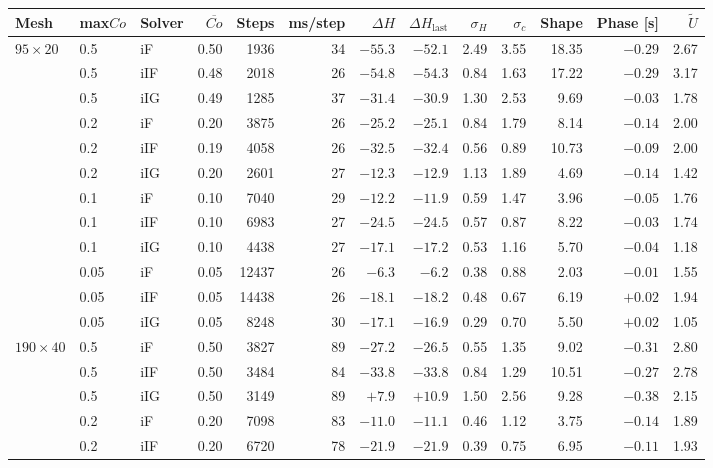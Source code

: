 \begin{tabular}{@{}lllrrrrrrrrrr@{}}
\toprule
Mesh & max$Co$ & Solver & $\overline{Co}$ & Steps & ms/step & $\Delta H$ & $\Delta H_\mathrm{last}$ & $\sigma_H$ & $\sigma_{c}$ & Shape & Phase [s] & $\tilde{U}$ \\
\midrule
$95\times20$ & 0.5 & iF & 0.50 & 1936 & 34 & $-55.3$ & $-52.1$ & 2.49 & 3.55 & 18.35 & $-0.29$ & 2.67 \\
 & 0.5 & iIF & 0.48 & 2018 & 26 & $-54.8$ & $-54.3$ & 0.84 & 1.63 & 17.22 & $-0.29$ & 3.17 \\
 & 0.5 & iIG & 0.49 & 1285 & 37 & $-31.4$ & $-30.9$ & 1.30 & 2.53 & 9.69 & $-0.03$ & 1.78 \\
 & 0.2 & iF & 0.20 & 3875 & 26 & $-25.2$ & $-25.1$ & 0.84 & 1.79 & 8.14 & $-0.14$ & 2.00 \\
 & 0.2 & iIF & 0.19 & 4058 & 26 & $-32.5$ & $-32.4$ & 0.56 & 0.89 & 10.73 & $-0.09$ & 2.00 \\
 & 0.2 & iIG & 0.20 & 2601 & 27 & $-12.3$ & $-12.9$ & 1.13 & 1.89 & 4.69 & $-0.14$ & 1.42 \\
 & 0.1 & iF & 0.10 & 7040 & 29 & $-12.2$ & $-11.9$ & 0.59 & 1.47 & 3.96 & $-0.05$ & 1.76 \\
 & 0.1 & iIF & 0.10 & 6983 & 27 & $-24.5$ & $-24.5$ & 0.57 & 0.87 & 8.22 & $-0.03$ & 1.74 \\
 & 0.1 & iIG & 0.10 & 4438 & 27 & $-17.1$ & $-17.2$ & 0.53 & 1.16 & 5.70 & $-0.04$ & 1.18 \\
 & 0.05 & iF & 0.05 & 12437 & 26 & $-6.3$ & $-6.2$ & 0.38 & 0.88 & 2.03 & $-0.01$ & 1.55 \\
 & 0.05 & iIF & 0.05 & 14438 & 26 & $-18.1$ & $-18.2$ & 0.48 & 0.67 & 6.19 & $+0.02$ & 1.94 \\
 & 0.05 & iIG & 0.05 & 8248 & 30 & $-17.1$ & $-16.9$ & 0.29 & 0.70 & 5.50 & $+0.02$ & 1.05 \\
\midrule
$190\times40$ & 0.5 & iF & 0.50 & 3827 & 89 & $-27.2$ & $-26.5$ & 0.55 & 1.35 & 9.02 & $-0.31$ & 2.80 \\
 & 0.5 & iIF & 0.50 & 3484 & 84 & $-33.8$ & $-33.8$ & 0.84 & 1.29 & 10.51 & $-0.27$ & 2.78 \\
 & 0.5 & iIG & 0.50 & 3149 & 89 & $+7.9$ & $+10.9$ & 1.50 & 2.56 & 9.28 & $-0.38$ & 2.15 \\
 & 0.2 & iF & 0.20 & 7098 & 83 & $-11.0$ & $-11.1$ & 0.46 & 1.12 & 3.75 & $-0.14$ & 1.89 \\
 & 0.2 & iIF & 0.20 & 6720 & 78 & $-21.9$ & $-21.9$ & 0.39 & 0.75 & 6.95 & $-0.11$ & 1.93 \\

\end{tabular}
